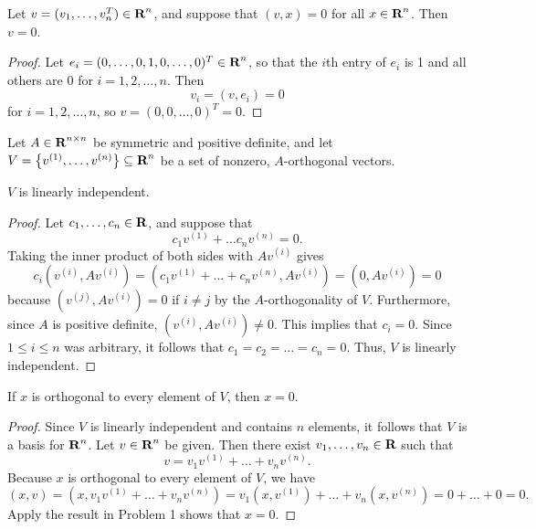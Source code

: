 \documentclass{homework}
\begin{document}
	\maketitle
	
	\question Let $v = (v_1, \dots, v_n^T) \in \textbf{R}^n$, and suppose that $(v,x) = 0$ for all $x \in \textbf{R}^n$. Then $v = 0$.
	\begin{proof}
		Let $e_i = (0, \dots, 0, 1, 0, \dots, 0)^T \in \textbf{R}^n$, so that the $i$th entry of $e_i$ is 1 and all others are 0 for $i = 1,2,\dots, n$. Then
		\begin{equation*}
			v_i = \left(v, e_i\right) = 0
		\end{equation*}
		for $i = 1,2,\dots, n$, so $v = (0, 0, \dots, 0)^T = 0$.
	\end{proof}
	
	\newcommand{\seq}[1]{^{(#1)}}
	\question Let $A \in \textbf{R}^{n\times n}$ be symmetric and positive definite, and let $V = \left\{v\seq{1}, \dots, v\seq{n}\right\} \subseteq \R^n$ be a set of nonzero, $A$-orthogonal vectors.
	
	\begin{alphaparts}
		\questionpart $V$ is linearly independent.
		\begin{proof}
			Let $c_1, \dots, c_n \in \textbf{R}$, and suppose that
			\begin{equation*}
				c_1v\seq{1} + \dots c_nv\seq{n} = 0.
			\end{equation*}
			Taking the inner product of both sides with $Av\seq{i}$ gives
			\begin{equation*}
				c_i \left(v\seq{i}, Av\seq{i}\right) = \left(c_1v\seq{1} + \dots + c_nv\seq{n}, Av\seq{i}\right) = \left(0, Av\seq{i}\right) = 0
			\end{equation*}
			because $\left(v\seq{j}, Av\seq{i}\right) = 0$ if $i \ne j$ by the $A$-orthogonality of $V$. Furthermore, since $A$ is positive definite, $\left(v\seq{i}, Av\seq{i}\right) \ne 0$. This implies that $c_i = 0$. Since $1 \le i \le n$ was arbitrary, it follows that $c_1 = c_2 = \dots = c_n = 0$. Thus, $V$ is linearly independent.
		\end{proof}
		
		\questionpart If $x$ is orthogonal to every element of $V$, then $x = 0$. 
		\begin{proof}
			Since $V$ is linearly independent and contains $n$ elements, it follows that $V$ is a basis for $\textbf{R}^n$. Let $v \in \textbf{R}^n$ be given. Then there exist $v_1, \dots, v_n \in \textbf{R}$ such that
			\begin{equation*}
				v = v_1v\seq{1} + \dots + v_nv\seq{n}.
			\end{equation*}
			Because $x$ is orthogonal to every element of $V$, we have
			\begin{equation*}
				(x, v) = \left(x, v_1v\seq{1} + \dots + v_nv\seq{n}\right) = v_1\left(x, v\seq{1}\right) + \dots + v_n\left(x, v\seq{n}\right) = 0 + \dots + 0 = 0.
			\end{equation*}
			Apply the result in Problem 1 shows that $x = 0$.
		\end{proof}
	\end{alphaparts}
	
\end{document}
